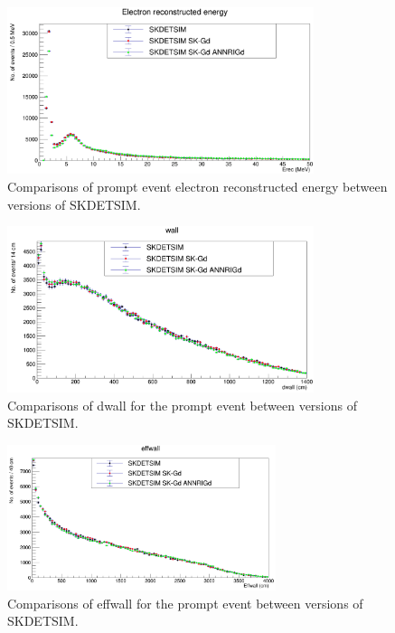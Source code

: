 \begin{figure}[htp]
    \centering
    \includegraphics[width=0.8\textwidth]{Figures/erec_compare.png}
    \caption{Comparisons of prompt event electron reconstructed energy between versions of SKDETSIM.}
    \label{fig:erec_compare}

\end{figure}

\begin{figure}[htp]
    \centering
    \includegraphics[width=0.8\textwidth]{Figures/dwall_compare.png}
    \caption{Comparisons of dwall for the prompt event between versions of SKDETSIM.}
    \label{fig:dwall_compare}

\end{figure}

\begin{figure}[htp]
    \centering
    \includegraphics[width=0.7\textwidth]{Figures/effwall_compare.png}
    \caption{Comparisons of effwall for the prompt event between versions of SKDETSIM.}
    \label{fig:effwall_compare}

\end{figure}

